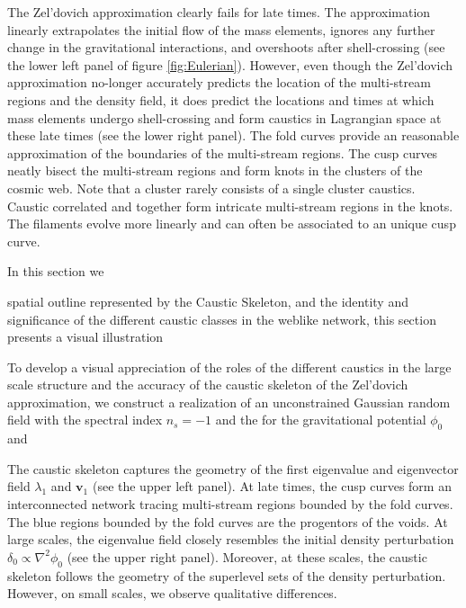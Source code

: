 \documentclass[a4paper, 11pt]{article}
\begin{document}
The Zel'dovich approximation clearly fails for late times. The
approximation linearly extrapolates the initial flow of the mass
elements, ignores any further change in the gravitational interactions,
and overshoots after shell-crossing (see the lower left panel of figure
\ref{fig:Eulerian}). However, even though the Zel'dovich approximation
no-longer accurately predicts the location of the multi-stream regions
and the density field, it does predict the locations and times at which
mass elements undergo shell-crossing and form caustics in Lagrangian
space at these late times (see the lower right panel). The fold curves
provide an reasonable approximation of the boundaries of the
multi-stream regions. The cusp curves neatly bisect the multi-stream
regions and form knots in the clusters of the cosmic web. Note that a
cluster rarely consists of a single cluster caustics. Caustic correlated
and together form intricate multi-stream regions in the knots. The
filaments evolve more linearly and can often be associated to an unique
cusp curve.






In this section we



spatial outline represented
by the Caustic Skeleton, and the identity and significance of the
different caustic classes in the weblike network, this section
presents a visual illustration


To develop a visual appreciation of the roles of the different caustics
in the large scale structure and the accuracy of the caustic skeleton of
the Zel'dovich approximation, we construct a realization of an
unconstrained Gaussian random field with the spectral index $n_s=-1$ and
the   for the gravitational potential $\phi_0$ and

The caustic skeleton captures the geometry of the first eigenvalue and
eigenvector field $\lambda_1$ and $\bm{v}_1$ (see the upper left panel).
At late times, the cusp curves form an interconnected network tracing
multi-stream regions bounded by the fold curves. The blue regions
bounded by the fold curves are the progentors of the voids. At large
scales, the eigenvalue field closely resembles the initial density
perturbation $\delta_0 \propto \nabla^2\phi_0$ (see the upper right
panel). Moreover, at these scales, the caustic skeleton follows the
geometry of the superlevel sets of the density perturbation. However, on
small scales, we observe qualitative differences.
\end{document}
